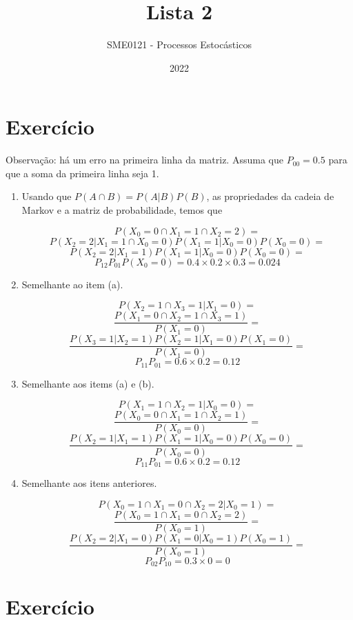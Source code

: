 \documentclass{article}
\title{Lista 2}
\author{SME0121 - Processos Estocásticos}
\date{2022}
\begin{document}
\maketitle

\section{Exercício}
Observação: há um erro na primeira linha da matriz. Assuma que $P_{00}=0.5$ para que a soma da primeira linha seja 1.
\begin{enumerate}[label=(\alph*)]

    \item Usando que $P(A\cap B)=P(A|B)P(B)$, as propriedades da cadeia de Markov e a matriz de probabilidade, temos que
    
    $$P(X_0=0\cap X_1=1\cap X_2=2) =$$
    $$P(X_2=2|X_1=1\cap X_0=0)P(X_1=1|X_0=0)P(X_0=0) =$$
    $$P(X_2=2|X_1=1)P(X_1=1|X_0=0)P(X_0=0) =$$
    $$P_{12}P_{01}P(X_0=0) = 0.4\times0.2 \times 0.3 = 0.024$$
    
    \item Semelhante ao item (a).
    
    $$P(X_2=1\cap X_3=1|X_1=0) =$$
    $$\frac{P(X_1=0\cap X_2=1\cap X_3=1)}{P(X_1=0)} =$$
    $$\frac{P(X_3=1|X_2=1)P(X_2=1|X_1=0)P(X_1=0)}{P(X_1=0)} =$$
    $$P_{11}P_{01} = 0.6\times 0.2 = 0.12$$
    
    \newpage
    
    \item Semelhante aos items (a) e (b).
    
    $$P(X_1=1\cap X_2=1|X_0=0) =$$
    $$\frac{P(X_0=0\cap X_1=1\cap X_2=1)}{P(X_0=0)} =$$
    $$\frac{P(X_2=1|X_1=1)P(X_1=1|X_0=0)P(X_0=0)}{P(X_0=0)} =$$
    $$P_{11}P_{01} = 0.6\times 0.2 = 0.12$$

    \item Semelhante aos itens anteriores.
    
    $$P(X_0=1\cap X_1=0\cap X_2=2|X_0=1) =$$
    $$\frac{P(X_0=1\cap X_1=0\cap X_2=2)}{P(X_0=1)} =$$
    $$\frac{P(X_2=2|X_1=0)P(X_1=0|X_0=1)P(X_0=1)}{P(X_0=1)} =$$
    $$P_{02}P_{10} = 0.3\times 0 = 0$$

\end{enumerate}

\section{Exercício}
\end{document}
